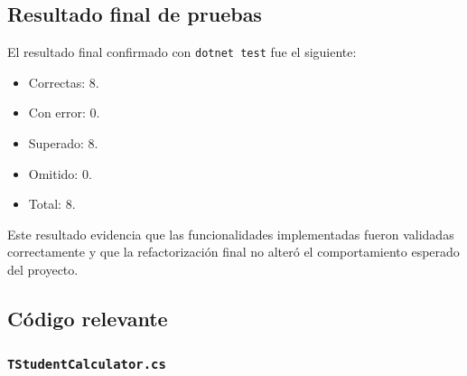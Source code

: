 \documentclass[12pt]{article}
\begin{document}
\subsection{Resultado final de pruebas}

El resultado final confirmado con \texttt{dotnet test} fue el siguiente:

\begin{itemize}
    \item Correctas: 8.
    \item Con error: 0.
    \item Superado: 8.
    \item Omitido: 0.
    \item Total: 8.
\end{itemize}

Este resultado evidencia que las funcionalidades implementadas fueron validadas correctamente y que la refactorización final no alteró el comportamiento esperado del proyecto.

\subsection{Código relevante}

\subsubsection{\texttt{TStudentCalculator.cs}}
\end{document}
